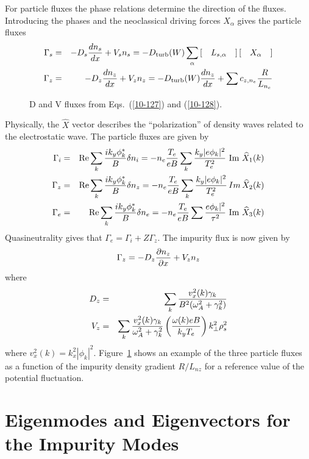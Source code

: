 \documentclass[a4paper,openany,12pt]{book}
\def\Re{\mathop{\rm Re}\nolimits}
\def\Im{\mathop{\rm Im}\nolimits}
\begin{document}
For particle fluxes the phase relations determine the direction of the fluxes. Introducing the phases and the neoclassical driving forces $X_\alpha$ gives the particle fluxes
\begin{eqnarray}
\Gamma_s&=&-D_s{dn_s\over dx}+V_s n_s=-D_{\rm turb}(W)\sum_\alpha\left[\quad L_{s,\alpha}\quad\right]\left[\quad X_\alpha\quad\right]\\
\Gamma_z&=&-D_z{dn_z\over dx}+V_z n_z=-D_{\rm turb}(W){dn_z\over dx}+\sum c_{z,n_e}{R\over L_{n_e}}
\end{eqnarray}
%
\begin{figure}[htb]
\centerline{}
\caption{D and V fluxes from Eqs.~(\ref{10-127}) and (\ref{10-128}).}
\label{F9.28}
\end{figure}
%
Physically, the $\widehat X$ vector describes the ``polarization'' of density waves related to the electrostatic wave. The particle fluxes are given by
\begin{eqnarray*}
\Gamma_i&=&\Re\sum_k{ik_y\phi^*_k\over B}\delta n_i=-n_e{T_e\over eB}\sum_k{k_y|e\phi_k|^2\over T^2_e}\,\Im\,\widehat X_1(k)\nonumber\\
%
\Gamma_z&=&\Re\sum_k{ik_y\phi^*_k\over B}\delta n_z=-n_e{T_e\over eB}\sum_k{k_y|e\phi_k|^2\over T^2_e}\,Im\,\widehat X_2(k)\\
%
\Gamma_e&=&\Re\sum_k{ik_y\phi^*_k\over B}\delta n_e=-n_e{T_e\over e B}
\sum{e\phi_k|^2\over\tau^2}\,\Im\,\widehat X_3(k)\nonumber
\end{eqnarray*}
Quasineutrality gives that $\Gamma_e=\Gamma_i+Z\Gamma_z$. The impurity flux is now given by
\begin{equation}
\Gamma_z=-D_z{\partial n_z\over\partial x}+V_z n_z
\end{equation}
where
\begin{eqnarray}
D_z&=&\sum_k{v^2_x(k)\gamma_k\over B^2(\omega^2_A+\gamma^2_k)}\label{10-127}\\
V_z&=&\sum_k{v^2_x(k)\gamma_k\over\omega^2_A+\gamma_k^2}\left({\omega(k)eB\over k_y T_e}\right)k^2_\perp\rho^2_s\label{10-128}
\end{eqnarray}
where $v_x^2(k)=k^2_x|\phi_k|^2$. Figure~\ref{F9.28} shows an example of the three particle fluxes as a function of the impurity density gradient $R/L_{nz}$ for a reference value of the potential fluctuation.

\section{Eigenmodes and Eigenvectors for the Impurity Modes}
\end{document}
